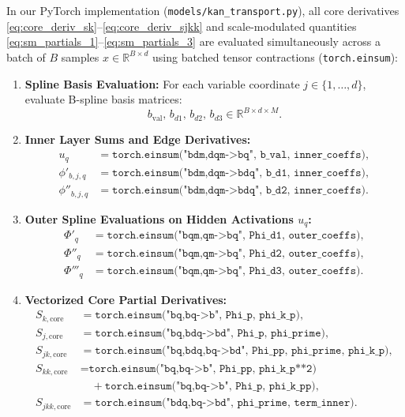 \documentclass[11pt,a4paper]{article}
\theoremstyle{plain}
\theoremstyle{definition}
\theoremstyle{remark}
\begin{document}
In our PyTorch implementation (\texttt{models/kan\_transport.py}), all core derivatives \eqref{eq:core_deriv_sk}--\eqref{eq:core_deriv_sjkk} and scale-modulated quantities \eqref{eq:sm_partials_1}--\eqref{eq:sm_partials_3} are evaluated simultaneously across a batch of $B$ samples $x \in \mathbb{R}^{B \times d}$ using batched tensor contractions (\texttt{torch.einsum}):

\begin{enumerate}
    \item \textbf{Spline Basis Evaluation:} For each variable coordinate $j \in \{1, \dots, d\}$, evaluate B-spline basis matrices:
    \begin{equation}
        b_{\text{val}}, \, b_{d1}, \, b_{d2}, \, b_{d3} \in \mathbb{R}^{B \times d \times M}.
    \end{equation}

    \item \textbf{Inner Layer Sums and Edge Derivatives:}
    \begin{align}
        u_q &= \texttt{torch.einsum("bdm,dqm->bq", b\_val, inner\_coeffs)}, \\
        \phi'_{b, j, q} &= \texttt{torch.einsum("bdm,dqm->bdq", b\_d1, inner\_coeffs)}, \\
        \phi''_{b, j, q} &= \texttt{torch.einsum("bdm,dqm->bdq", b\_d2, inner\_coeffs)}.
    \end{align}

    \item \textbf{Outer Spline Evaluations on Hidden Activations $u_q$:}
    \begin{align}
        \Phi'_q &= \texttt{torch.einsum("bqm,qm->bq", Phi\_d1, outer\_coeffs)}, \\
        \Phi''_q &= \texttt{torch.einsum("bqm,qm->bq", Phi\_d2, outer\_coeffs)}, \\
        \Phi'''_q &= \texttt{torch.einsum("bqm,qm->bq", Phi\_d3, outer\_coeffs)}.
    \end{align}

    \item \textbf{Vectorized Core Partial Derivatives:}
    \begin{align}
        S_{k, \text{core}} &= \texttt{torch.einsum("bq,bq->b", Phi\_p, phi\_k\_p)}, \\
        S_{j, \text{core}} &= \texttt{torch.einsum("bq,bdq->bd", Phi\_p, phi\_prime)}, \\
        S_{jk, \text{core}} &= \texttt{torch.einsum("bq,bdq,bq->bd", Phi\_pp, phi\_prime, phi\_k\_p)}, \\
        S_{kk, \text{core}} &= \texttt{torch.einsum("bq,bq->b", Phi\_pp, phi\_k\_p**2)} \nonumber \\
        &\quad + \texttt{torch.einsum("bq,bq->b", Phi\_p, phi\_k\_pp)}, \\
        S_{jkk, \text{core}} &= \texttt{torch.einsum("bdq,bq->bd", phi\_prime, term\_inner)}.
    \end{align}
\end{enumerate}
\end{document}
